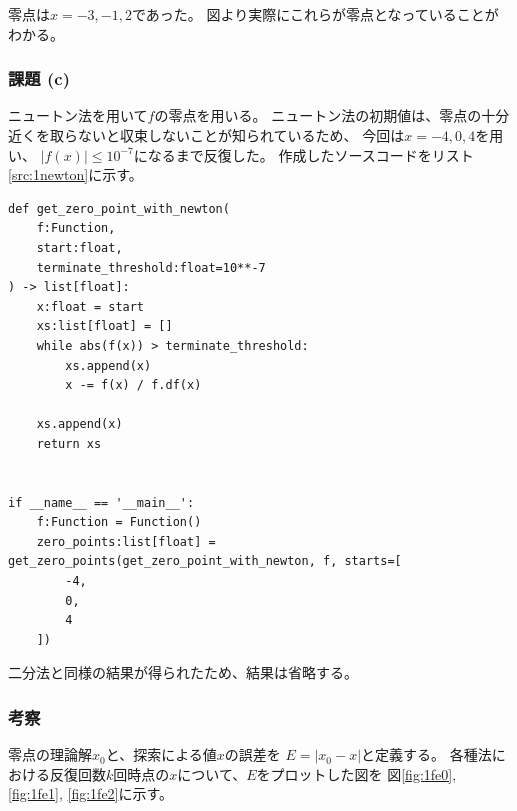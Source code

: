 \documentclass[a4j, titlepage]{jsarticle}
\numberwithin{equation}{section}
\begin{document}
            零点は$x=-3,-1,2$であった。
            図より実際にこれらが零点となっていることがわかる。

        \subsubsection{課題 (c)}
            ニュートン法を用いて$f$の零点を用いる。
            ニュートン法の初期値は、零点の十分近くを取らないと収束しないことが知られているため、
            今回は$x=-4,0,4$を用い、
            $|f(x)|\leq 10^{-7}$になるまで反復した。
            作成したソースコードをリスト\ref{src:1newton}に示す。

            \begin{lstlisting}[caption=ニュートン法の実装, label=src:1newton]
def get_zero_point_with_newton(
    f:Function,
    start:float,
    terminate_threshold:float=10**-7
) -> list[float]:
    x:float = start
    xs:list[float] = []
    while abs(f(x)) > terminate_threshold:
        xs.append(x)
        x -= f(x) / f.df(x)
        
    xs.append(x)
    return xs


if __name__ == '__main__':
    f:Function = Function()
    zero_points:list[float] = get_zero_points(get_zero_point_with_newton, f, starts=[
        -4,
        0,
        4
    ])
            \end{lstlisting}

            二分法と同様の結果が得られたため、結果は省略する。

        \subsubsection{考察}
            零点の理論解$x_0$と、探索による値$x$の誤差を
            $E=|x_0-x|$と定義する。
            各種法における反復回数$k$回時点の$x$について、$E$をプロットした図を
            図\ref{fig:1fe0}, \ref{fig:1fe1}, \ref{fig:1fe2}に示す。
\end{document}
